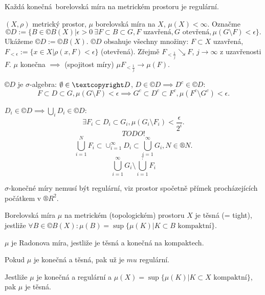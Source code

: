 \documentclass[12pt]{article}					%
\begin{document}
\begin{veta}
	Každá konečná borelovská míra na metrickém prostoru je regulární.

	\begin{dukazin}
		$(X, \rho)$ metrický prostor, $\mu$ borelovská míra na $X$, $\mu(X) < ∞$. Označme
		$$ ©D := \{B \in ©B(X) | \epsilon > 0 \ \exists F \subset B \subset G, F \text{ uzavřená}, G \text{ otevřená}, \mu(G \setminus F) < \epsilon\}. $$
		Ukážeme $©D := ©B(X)$. $©D$ obsahuje všechny množiny: $F \subset X$ uzavřená, $F_{<\epsilon} := \{x \in X | \rho(x, F) < \epsilon\}$ (otevřená). Zřejmě $F_{<\frac{1}{j}} \searrow F$, $j \rightarrow ∞$ z uzavřenosti $F$. $\mu$ konečna $\implies$ (spojitost míry) $\mu F_{<\frac{1}{j}} \rightarrow \mu(F)$.

		$©D$ je $\sigma$-algebra: $\O \in ©D$, $D \in ©D \implies D^c \in ©D$:
		$$ F \subset D \subset G, \mu(G \setminus F) < \epsilon \implies G^c \subset D^c \subset F^c, \mu(F^c \setminus G^c) < \epsilon. $$

		$D_i \in ©D \implies \bigcup_i D_i \in ©D$:
		$$ \exists F_i \subset D_i \subset G_i, \mu(G_i \setminus F_i) < \frac{\epsilon}{2^i}. $$
		$$ TODO! $$
		$$ \bigcup_{i=1}^N F_i \subset \cup_{i=1}^∞ D_i \subset \bigcup_{i = 1}^∞ G_i, N \in ®N. $$
		$$ \bigcup_{i=1}^∞ G_i \setminus \bigcup_{i=1}^?F_i $$
	\end{dukazin}


	\begin{poznamkain}
		$\sigma$-konečné míry nemusí být regulární, viz prostor spočetně přímek procházejících počátkem v $®R^2$.
	\end{poznamkain}
\end{veta}

\begin{definice}[Těsnost (= vnitřní regularita)]
	Borelovská míra $\mu$ na metrickém (topologickém) prostoru $X$ je těsná (= tight), jestliže $\forall B \in ©B(X): \mu(B) = \sup\{\mu(K) | K \subset B \text{ kompaktní}\}$.
\end{definice}

\begin{poznamka}
	$\mu$ je Radonova míra, jestliže je těsná a konečná na kompaktech.

	Pokud $\mu$ je konečná a těsná, pak už je $mu$ regulární.

	Jestliže $\mu$ je konečná a regulární a $\mu(X) = \sup\{\mu(K) | K \subset X \text{ kompaktní}\}$, pak $\mu$ je těsná.
\end{poznamka}
\end{document}
